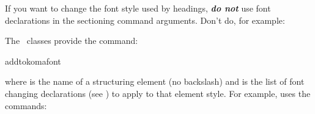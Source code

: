 If you want to change the font style used by headings, 
\emph{\bfseries do not} use font declarations in the sectioning command
arguments. Don't do, for example:
\begin{alltt}\wrong
{}
\end{alltt}
The \koma\ classes provide the command:
\begin{definition}
\gls{addtokomafont}
\end{definition}
where  is the name of a structuring element (no
backslash) and  is the list of font changing
declarations (see ) to apply to that element style.
For example, 
uses the commands:
\begin{code}
\begin{alltt}
\end{alltt}
\end{code}

